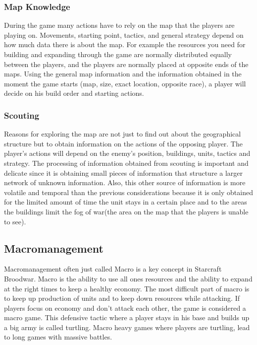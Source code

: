 			\subsubsection{Map Knowledge}
				During the game many actions have to rely on the map that the players are playing on. Movements, starting point, 
				tactics, and general strategy depend on how much data there is about the map. 				
				For example the resources you need for building and expanding through the game are normally distributed
				equally between the players, and the players are normally placed at opposite ends of the maps. 
				Using the general map information and the information obtained in the moment the game starts 
				(map, size, exact location, opposite race), a player will decide on his build order and starting actions. 
		
			\subsubsection{Scouting}
				Reasons for exploring the map are not just to find out about the geographical structure 
				but to obtain information on the actions of the opposing player. The player's actions will depend on
				the enemy's position, buildings, units, tactics and strategy. The processing of information 
				obtained from scouting is important and delicate since it is obtaining small pieces of information 
				that structure a larger network of unknown information. Also, this other source of information 
				is more volatile and temporal than the previous considerations because it is only obtained for the 
				limited amount of time the unit stays in a certain place and to the areas the buildings limit the fog of war(the area on the map that the players is unable to see).
				
	\subsection{Macromanagement}
		Macromanagement often just called Macro is a key concept in Starcraft Broodwar. 
		Macro is the ability to use all ones resources and the ability to expand at the right times to keep a healthy economy.
		The most difficult part of macro is to keep up production of units and to keep down resources while attacking.
		If players focus on economy and don't attack each other, the game is considered a macro game. This defensive tactic where a
		player stays in his base and builds up a big army is called turtling. Macro heavy games where players are turtling, lead to
		long games with massive battles. 
			
